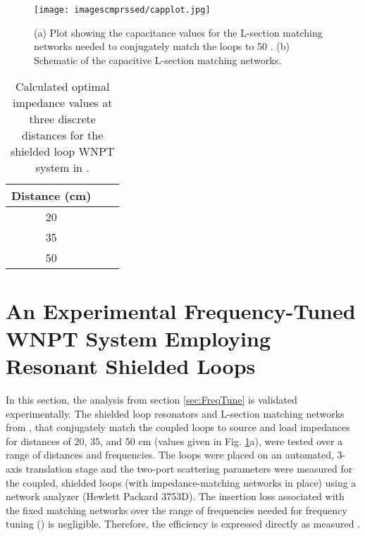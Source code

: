 \documentclass[journal]{IEEEtran}
\begin{document}
\begin{figure}[htbp]
    \centering
    \texttt{[image: imagescmprssed/capplot.jpg]}
    \caption{(a) Plot showing the capacitance values for the L-section matching networks needed to conjugately match the loops to 50 . (b) Schematic of the capacitive L-section matching networks.}
    \label{fig:capplot}
\end{figure}

\begin{table}[htbp]
\centering
\renewcommand{\arraystretch}{1.2}
\begin{tabular}{|c|c|c|}
\hline
Distance (cm) &  &   \\ \hline
20 &  &  \\ \hline
35 &  &  \\ \hline
50 &  &  \\ \hline
\end{tabular}
\caption{Calculated optimal impedance values at three discrete distances for the shielded loop WNPT system in \cite{Thomas}.}
\label{table:MatchValues}
\end{table}

\section{An Experimental Frequency-Tuned WNPT System Employing Resonant Shielded Loops}

In this section, the analysis from section \ref{sec:FreqTune} is validated experimentally. The shielded loop resonators and L-section matching networks from \cite{Thomas}, that conjugately match the coupled loops to   source and load impedances for distances of 20, 35, and 50 cm (values given in Fig. \ref{fig:capplot}a), were tested over a range of distances and frequencies. The loops were placed on an automated, 3-axis translation stage and the two-port scattering parameters were measured for the coupled, shielded loops (with impedance-matching networks in place) using a network analyzer (Hewlett Packard 3753D). The insertion loss associated with the fixed matching networks over the range of frequencies needed for frequency tuning () is negligible. Therefore, the efficiency is expressed directly as measured .
\end{document}

